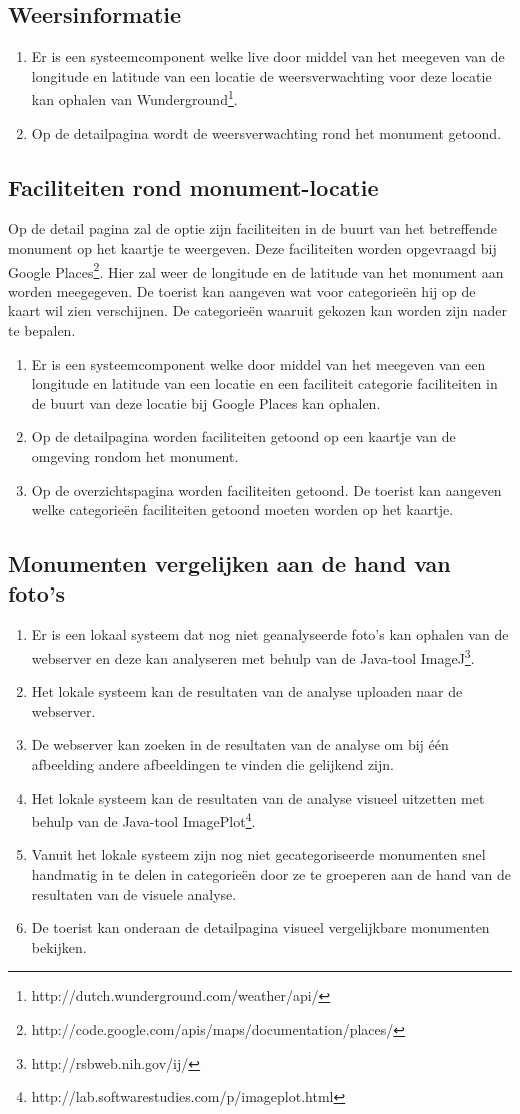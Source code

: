 \documentclass[a4paper,10pt]{article}
\newcommand{\rsubsection}[1]{
\subsection{#1}\label{sec:sub:#1}
}
\begin{document}
\rsubsection{Weersinformatie}
\begin{enumerate}
\item Er is een systeemcomponent welke live door middel van het meegeven van de longitude en latitude van een locatie de weersverwachting voor deze locatie kan ophalen van Wunderground\footnote{http://dutch.wunderground.com/weather/api/}.
\item Op de detailpagina wordt de weersverwachting rond het monument getoond.
\end{enumerate}
                
\rsubsection{Faciliteiten rond monument-locatie}
Op de detail pagina zal de optie zijn faciliteiten in de buurt van het betreffende monument op het kaartje te weergeven. Deze faciliteiten worden opgevraagd bij Google Places\footnote{http://code.google.com/apis/maps/documentation/places/}. Hier zal weer de longitude en de latitude van het monument aan worden meegegeven. De toerist kan aangeven wat voor categorie\"en hij op de kaart wil zien verschijnen. De categorie\"en waaruit gekozen kan worden zijn nader te bepalen.
\begin{enumerate}
\item Er is een systeemcomponent welke door middel van het meegeven van een longitude en latitude van een locatie en een faciliteit categorie faciliteiten in de buurt van deze locatie bij Google Places kan ophalen.
\item Op de detailpagina worden faciliteiten getoond op een kaartje van de omgeving rondom het monument.
	  \item  Op de overzichtspagina worden faciliteiten getoond. De toerist kan aangeven welke categorie\"en faciliteiten getoond moeten worden op het kaartje.
\end{enumerate}
                
\rsubsection{Monumenten vergelijken aan de hand van foto's}
\begin{enumerate}
		\item Er is een lokaal systeem dat nog niet geanalyseerde foto's kan ophalen van de webserver en deze kan analyseren met behulp van de Java-tool ImageJ\footnote{http://rsbweb.nih.gov/ij/}.
		\item Het lokale systeem kan de resultaten van de analyse uploaden naar de webserver.
		\item De webserver kan zoeken in de resultaten van de analyse om bij \'e\'en afbeelding andere afbeeldingen te vinden die gelijkend zijn.
		\item Het lokale systeem kan de resultaten van de analyse visueel uitzetten met behulp van de Java-tool  ImagePlot\footnote{http://lab.softwarestudies.com/p/imageplot.html}.
		\item Vanuit het lokale systeem zijn nog niet gecategoriseerde monumenten snel handmatig in te delen in categorie\"en door ze te groeperen aan de hand van de resultaten van de visuele analyse.
		\item De toerist kan onderaan de detailpagina visueel vergelijkbare monumenten bekijken.
\end{enumerate}
	                
\end{document}
